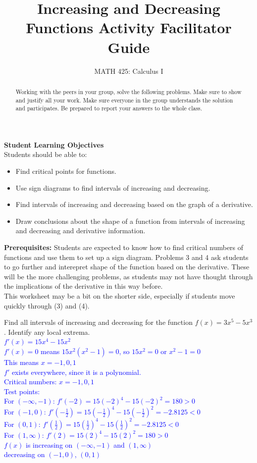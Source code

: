 \documentclass{ximera}
\title{Increasing and Decreasing Functions Activity Facilitator Guide}
\author{MATH 425: Calculus I}
\begin{document}
\begin{abstract}
   Working with the peers in your group, solve the following problems. Make sure to show and justify all your work. Make sure everyone in the group understands the solution and participates. Be prepared to report your answers to the whole class. 
\end{abstract}
\maketitle

\textbf{Student Learning Objectives}\\
Students should be able to: 
    \begin{itemize}
        \item Find critical points for functions.
        \item Use sign diagrams to find intervals of increasing and decreasing. 
        \item Find intervals of increasing and decreasing based on the graph of a derivative. 
        \item Draw conclusions about the shape of a function from intervals of increasing and decreasing and derivative information.
    \end{itemize}

\textbf{Prerequisites:} Students are expected to know how to find critical numbers of functions and use them to set up a sign diagram.  Problems 3 and 4 ask students to go further and interepret shape of the function based on the derivative.  These will be the more challenging problems, as students may not have thought through the implications of the derivative in this way before.\\

This worksheet may be a bit on the shorter side, especially if students move quickly through (3) and (4).  

\begin{exercise}
    Find all intervals of increasing and decreasing for the function $f(x)=3x^5-5x^3$.  Identify any local extrema.\\
    \textcolor{blue}{$f'(x)=15x^4-15x^2$\\
    $f'(x)=0$ means $15x^2(x^2-1)=0$, so $15x^2=0$ or $x^2-1=0$\\
    This means $x=-1, 0, 1$\\
    $f'$ exists everywhere, since it is a polynomial.\\
    Critical numbers: $x=-1,0,1$\\
    Test points:\\
    For $(-\infty,-1)$: $f'(-2)=15(-2)^4-15(-2)^2=180>0$\\
    For $(-1,0)$: $f'(-\frac12)=15(-\frac12)^4-15(-\frac12)^2=-2.8125<0$\\
    For $(0,1)$: $f'(\frac12)=15(\frac12)^4-15(\frac12)^2=-2.8125<0$\\
    For $(1,\infty)$: $f'(2)=15(2)^4-15(2)^2=180>0$\\
    $f(x)$ is increasing on $(-\infty,-1)$ and $(1,\infty)$\\
    decreasing on $(-1,0)$, $(0,1)$}
\end{exercise}
\end{document}
